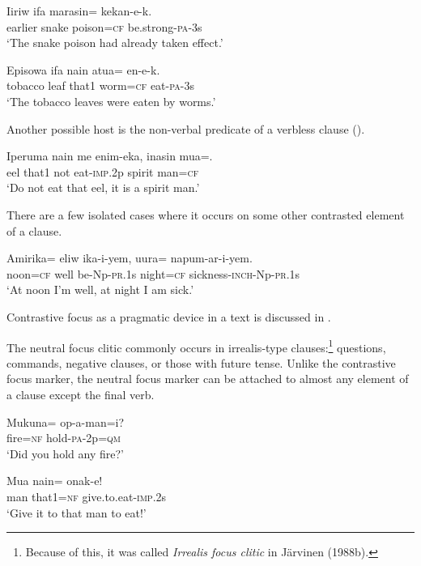 \ea%
\label{ex:3:x781}
\gll Iiriw ifa marasin= kekan-e-k. \\
earlier snake poison=\textsc{cf} be.strong-\textsc{pa}-3s\\
\glt`The snake poison had already taken effect.'
\z

\ea%
\label{ex:3:x782}
\gll Episowa ifa nain atua= en-e-k. \\
tobacco leaf that1 worm=\textsc{cf} eat-\textsc{pa}-3s\\
\glt`The tobacco leaves were eaten by worms.'
\z

Another possible host is the non-verbal predicate of a verbless clause ().

\ea%
\label{ex:3:x783}
\gll Iperuma nain me enim-eka, inasin mua=. \\
eel that1 not eat-\textsc{imp}.2p spirit man=\textsc{cf}\\
\glt`Do not eat that eel, it is a spirit man.'
\z

There are a few isolated cases where it occurs on some other contrasted element of a clause.

\ea%
\label{ex:3:x784}
\gll Amirika= eliw ika-i-yem, uura= napum-ar-i-yem. \\
noon=\textsc{cf} well be-Np-\textsc{pr}.1s night=\textsc{cf} sickness-\textsc{inch}-Np-\textsc{pr}.1s\\
\glt`At noon I'm well, at night I am sick.'
\z

Contrastive focus as a pragmatic device in a text is discussed in .

The neutral focus clitic  commonly occurs in irrealis-type clauses:\footnote{Because of this, it was called \textit{Irrealis focus clitic} in J\"arvinen (1988b).} questions, commands, negative clauses, or those with future tense. Unlike the contrastive focus marker, the neutral focus marker can be attached to almost any element of a clause except the final verb. 

\ea%
\label{ex:3:x785}
\gll Mukuna= op-a-man=i? \\
fire=\textsc{nf} hold-\textsc{pa}-2p=\textsc{qm}\\
\glt`Did you hold any fire?'
\z

\ea%
\label{ex:3:x786}
\gll Mua nain= onak-e! \\
man that1=\textsc{nf} give.to.eat-\textsc{imp}.2s\\
\glt`Give it to that man to eat!'
\z

